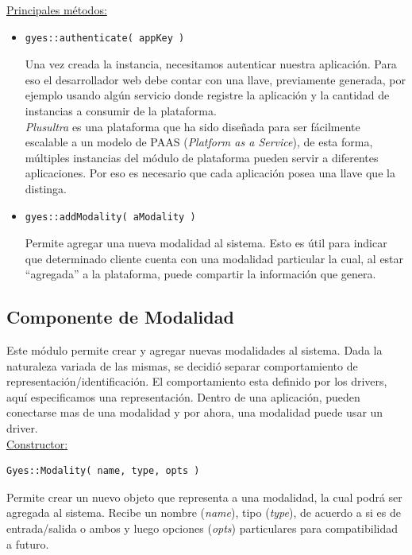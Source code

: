 \underline{\textsf{Principales métodos:}}\\
\begin{itemize}
\item[]
\begin{lstlisting}
gyes::authenticate( appKey )
\end{lstlisting}
Una vez creada la instancia, necesitamos autenticar nuestra aplicación. Para eso el desarrollador web debe contar con una llave, previamente generada, por ejemplo usando algún servicio donde registre la aplicación y la cantidad de instancias a consumir de la plataforma.
\\

\emph{Plusultra} es una plataforma que ha sido diseñada para ser fácilmente escalable a un modelo de PAAS (\emph{Platform as a Service}), de esta forma, múltiples instancias del módulo de plataforma pueden servir a diferentes aplicaciones. Por eso es necesario que cada aplicación posea una llave que la distinga.

\item[]
\begin{lstlisting}
gyes::addModality( aModality )
\end{lstlisting}
Permite agregar una nueva modalidad al sistema. Esto es útil para indicar que determinado cliente cuenta con una modalidad particular la cual, al estar ``agregada'' a la plataforma, puede compartir la información que genera.
\end{itemize}

\subsection{Componente de Modalidad}

Este módulo permite crear y agregar nuevas modalidades al sistema. Dada la naturaleza variada de las mismas, se decidió separar comportamiento de representación/identificación. El comportamiento esta definido por los drivers, aquí especificamos una representación. Dentro de una aplicación, pueden conectarse mas de una modalidad y por ahora, una modalidad puede usar un driver.
\\

\underline{\textsf{Constructor:}}\\
\begin{lstlisting}
Gyes::Modality( name, type, opts )
\end{lstlisting}
Permite crear un nuevo objeto que representa a una modalidad, la cual podrá ser agregada al sistema. Recibe un nombre (\emph{name}), tipo (\emph{type}), de acuerdo a si es de entrada/salida o ambos y luego opciones (\emph{opts}) particulares para compatibilidad a futuro.
\\

